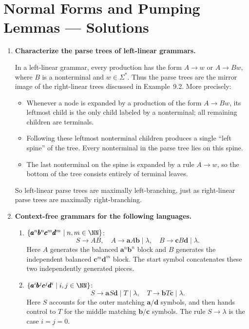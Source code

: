 
\chapter{Normal Forms and Pumping Lemmas --- Solutions}

\begin{enumerate}[{9.}1. ]

\item \textbf{Characterize the parse trees of left-linear grammars.}

In a left-linear grammar, every production has the form $A \to w$ or
$A \to Bw$, where $B$ is a nonterminal and $w \in \Sigma^*$.  Thus the parse
trees are the mirror image of the right-linear trees discussed in Example~9.2.
More precisely:
\begin{itemize}
\item Whenever a node is expanded by a production of the form $A \to Bw$, its
leftmost child is the only child labeled by a nonterminal; all remaining
children are terminals.
\item Following these leftmost nonterminal children produces a single
``left spine'' of the tree.  Every nonterminal in the parse tree lies on this
spine.
\item The last nonterminal on the spine is expanded by a rule $A \to w$, so the
bottom of the tree consists entirely of terminal leaves.
\end{itemize}
So left-linear parse trees are maximally left-branching, just as right-linear
parse trees are maximally right-branching.

\item \textbf{Context-free grammars for the following languages.}

\begin{enumerate}
\item $\{\pmb{a}^n\pmb{b}^n\pmb{c}^m\pmb{d}^m \mid n,m \in \NN\}$:
\[
S \to AB, \quad A \to \pmb{a}A\pmb{b} \mid \lambda, \quad B \to \pmb{c}B\pmb{d} \mid \lambda.
\]
Here $A$ generates the balanced $\pmb{a}^n\pmb{b}^n$ block and $B$
generates the independent balanced $\pmb{c}^m\pmb{d}^m$ block. The start
symbol concatenates these two independently generated pieces.

\item $\{\pmb{a}^i\pmb{b}^j\pmb{c}^j\pmb{d}^i \mid i,j \in \NN\}$:
\[
S \to \pmb{a}S\pmb{d} \mid T \mid \lambda, \quad T \to \pmb{b}T\pmb{c} \mid \lambda.
\]
Here $S$ accounts for the outer matching $\pmb{a}/\pmb{d}$ symbols, and
then hands control to $T$ for the middle matching $\pmb{b}/\pmb{c}$ symbols.
The rule $S\to\lambda$ is the case $i=j=0$.


\end{enumerate}
\end{enumerate}
